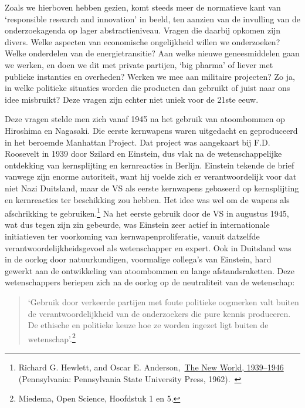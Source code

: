 \documentclass[empirical, authordate, ]{new-jote-article}
\begin{document}
	Zoals we hierboven hebben gezien, komt steeds meer de normatieve kant van ‘responsible research and innovation' in beeld, ten aanzien van de invulling van de onderzoekagenda op lager abstractieniveau. Vragen die daarbij opkomen zijn divers. Welke aspecten van economische ongelijkheid willen we onderzoeken? Welke onderdelen van de energietransitie? Aan welke nieuwe geneesmiddelen gaan we werken, en doen we dit met private partijen, ‘big pharma' of liever met publieke instanties en overheden? Werken we mee aan militaire projecten? Zo ja, in welke politieke situaties worden die producten dan gebruikt of juist naar ons idee misbruikt? Deze vragen zijn echter niet uniek voor de 21ste eeuw.



	Deze vragen stelde men zich vanaf 1945 na het gebruik van atoombommen op Hiroshima en Nagasaki. Die eerste kernwapens waren uitgedacht en geproduceerd in het beroemde Manhattan Project. Dat project was aangekaart bij F.D. Roosevelt in 1939 door Szilard en Einstein, dus vlak na de wetenschappelijke ontdekking van kernsplijting en kernreacties in Berlijn. Einstein tekende de brief vanwege zijn enorme autoriteit, want hij voelde zich er verantwoordelijk voor dat niet Nazi Duitsland, maar de VS als eerste kernwapens gebaseerd op kernsplijting en kernreacties ter beschikking zou hebben. Het idee was wel om de wapens als afschrikking te gebruiken.\footnote{Richard G. Hewlett, and Oscar E. Anderson, \href{about:blank}{The New World, 1939--1946} (Pennsylvania: Pennsylvania State University Press, 1962).  } Na het eerste gebruik door de VS in augustus 1945, wat dus tegen zijn zin gebeurde, was Einstein zeer actief in internationale initiatieven ter voorkoming van kernwapenproliferatie, vanuit datzelfde verantwoordelijkheidsgevoel als wetenschapper en expert. Ook in Duitsland was in de oorlog door natuurkundigen, voormalige collega's van Einstein, hard gewerkt aan de ontwikkeling van atoombommen en lange afstandsraketten. Deze wetenschappers beriepen zich na de oorlog op de neutraliteit van de wetenschap:

	\begin{quote}
		\itshape

		‘Gebruik door verkeerde partijen met foute politieke oogmerken valt buiten de verantwoordelijkheid van de onderzoekers die pure kennis produceren. De ethische en politieke keuze hoe ze worden ingezet ligt buiten de wetenschap'.\footnote{Miedema, Open Science, Hoofdstuk 1 en 5.}
	\end{quote}
\end{document}
